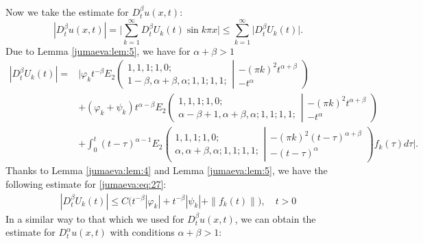 \documentclass{amsart}
\numberwithin{equation}{section}
\begin{document}
Now we take the estimate for $D_t^\beta u(x,t)$:
\begin{equation}
|D_t^\beta u(x,t)|=\bigg|\sum_{k=1}^\infty D_t^\beta U_k(t) \sin{k \pi x}\bigg|\leq\sum_{k=1}^\infty \bigg|D_t^\beta U_k(t)\bigg|.\label{jumaeva:eq:27}
\end{equation}
Due to Lemma \ref{jumaeva:lem:5}, we have for $\alpha+\beta>1$
\begin{align}
|D_t^\beta U_k(t)|=&\bigg|\varphi_k t^{-\beta} E_2\left( \begin{array}{c}1, 1, 1; 1, 0; \\1-\beta, \alpha+\beta, \alpha ; 1, 1; 1, 1; \end{array}\left| \begin{array}{c}-(\pi k)^2 t^{\alpha+\beta} \\-t^\alpha \end{array}\right.\right) \nonumber \\
&+(\varphi_k+\psi_k)t^{\alpha-\beta} E_2\left( \begin{array}{c}1, 1, 1; 1, 0; \\\alpha-\beta+1, \alpha+\beta, \alpha ; 1, 1; 1, 1; \end{array}\left| \begin{array}{c}-(\pi k)^2 t^{\alpha+\beta} \\-t^\alpha\end{array}\right.\right) \nonumber \\
&+\int_0^t (t-\tau)^{\alpha-1} E_2\left( \begin{array}{c}1, 1, 1; 1, 0; \\\alpha, \alpha+\beta, \alpha ; 1, 1; 1, 1;\end{array}\left| \begin{array}{c}-(\pi k)^2 (t-\tau)^{\alpha+\beta} \\-(t-\tau)^\alpha\end{array}\right.\right) f_k(\tau) d\tau \bigg|.\label{jumaeva:eq:28}
\end{align}
Thanks to Lemma \ref{jumaeva:lem:4} and Lemma \ref{jumaeva:lem:5}, we have the following estimate for \eqref{jumaeva:eq:27}:
\begin{align}
 |D_t^\beta U_k(t)|\leq C\bigg(t^{-\beta}|\varphi_k|+t^{-\beta}|\psi_k|+\|f_k(t)\|\bigg), \quad t>0\label{jumaeva:eq:29}
\end{align}
In a similar way to that which we used for $D_t^\beta u(x,t)$, we can obtain the estimate for $D_t^\alpha u(x,t)$  with conditions $\alpha+\beta>1$:
\end{document}
